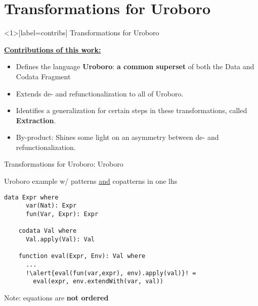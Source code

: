 \documentclass[xcolor=svgnames]{beamer}
\begin{document}
\section
  {Transformations for Uroboro}


\begin{frame}<1>[label=contribs]
  {Transformations for Uroboro}

  \underline{\textbf{Contributions of this work:}}

  \begin{itemize}
  \item \alert<2>{Defines the language \textbf{Uroboro}: \textbf{a common superset} of both the Data and Codata Fragment}

  \item \alert<3>{Extends de- and refunctionalization to all of Uroboro.}

  \item \alert<4>{Identifies a generalization for certain steps in these transformations, called \textbf{Extraction}.}

  \item \alert<5>{By-product: Shines some light on an asymmetry between de- and refunctionalization.}
   \end{itemize}
\end{frame}


\begin{frame}[fragile]
  {Transformations for Uroboro: Uroboro}

  \begin{block}{Uroboro example w/ patterns \underline{and} copatterns in one lhs}
    \begin{lstlisting}[escapechar=!]
    data Expr where
      var(Nat): Expr
      fun(Var, Expr): Expr

    codata Val where
      Val.apply(Val): Val

    function eval(Expr, Env): Val where
      ...
      !\alert{eval(fun(var,expr), env).apply(val)}! = 
        eval(expr, env.extendWith(var, val))
    \end{lstlisting}
  \end{block}

  Note: equations are \textbf{not ordered}
\end{frame}

\end{document}
